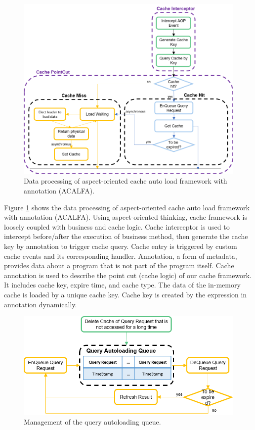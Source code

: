 \documentclass{singlecol-new}
\theoremstyle{TH}{
\newtheorem{lemma}{Lemma}
\newtheorem{theorem}[lemma]{Theorem}
\newtheorem{corrolary}[lemma]{Corrolary}
\newtheorem{conjecture}[lemma]{Conjecture}
\newtheorem{proposition}[lemma]{Proposition}
\newtheorem{claim}[lemma]{Claim}
\newtheorem{stheorem}[lemma]{Wrong Theorem}
}
\theoremstyle{THrm}{
\newtheorem{definition}{Definition}[section]
\newtheorem{question}{Question}[section]
\newtheorem{remark}{Remark}
\newtheorem{scheme}{Scheme}
}
\theoremstyle{THhit}{
\newtheorem{case}{Case}[section]
}
\begin{document}
\begin{figure} [htb]
\centering
\includegraphics[width=1.0\linewidth]{img/process}
\caption{\label{process}Data processing of aspect-oriented cache auto load framework with annotation (ACALFA).}
\end{figure}

Figure \ref{process} shows the data processing of aspect-oriented cache auto load framework with annotation (ACALFA). Using aspect-oriented thinking, cache framework is loosely coupled with business and cache logic. Cache interceptor is used to intercept before/after the execution of business method, then generate the cache key by annotation to trigger cache query. Cache entry is triggered by custom cache events and its corresponding handler. Annotation, a form of metadata, provides data about a program that is not part of the program itself. Cache annotation is used to describe the point cut (cache logic) of our cache framework. It includes cache key, expire time, and cache type. The data of the in-memory cache is loaded by a unique cache key. Cache key is created by the expression in annotation dynamically.

\begin{figure} [htb]
\centering
\includegraphics[width=1.0\linewidth]{img/autoloading}
\caption{\label{autoloading}Management of the query autoloading queue.}
\end{figure}
\end{document}
